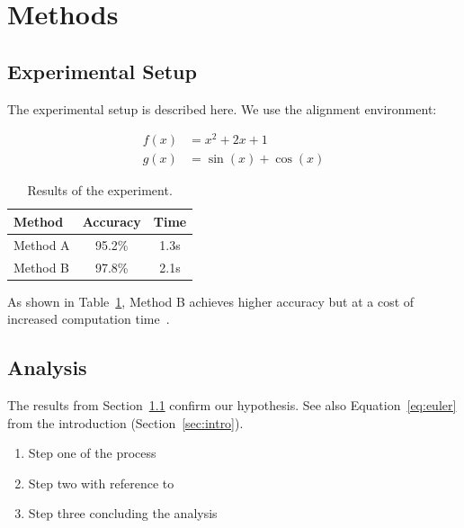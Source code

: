 \section{Methods}
\label{sec:methods}

\subsection{Experimental Setup}
\label{subsec:setup}

The experimental setup is described here. We use the alignment environment:

\begin{align}
  f(x) &= x^2 + 2x + 1 \label{eq:quadratic} \\
  g(x) &= \sin(x) + \cos(x) \label{eq:trig}
\end{align}

\begin{table}[htbp]
  \centering
  \caption{Results of the experiment.}
  \label{tab:results}
  \begin{tabular}{lcc}
    \toprule
    Method & Accuracy & Time \\
    \midrule
    Method A & 95.2\% & 1.3s \\
    Method B & 97.8\% & 2.1s \\
    \bottomrule
  \end{tabular}
\end{table}

As shown in Table~\ref{tab:results}, Method B achieves higher accuracy
but at a cost of increased computation time~\cite{Smith2020,Jones2021}.

\subsection{Analysis}

The results from Section~\ref{subsec:setup} confirm our hypothesis.
See also Equation~\eqref{eq:euler} from the introduction (Section~\ref{sec:intro}).

\begin{enumerate}
  \item Step one of the process
  \item Step two with reference to~\cite{Einstein1905}
  \item Step three concluding the analysis
\end{enumerate}
